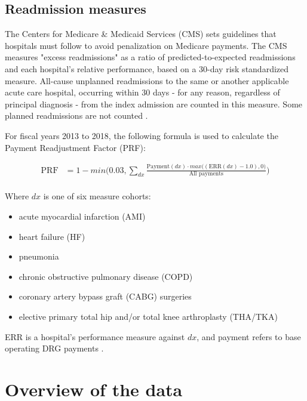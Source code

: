 \documentclass[12pt]{ociamthesis}\usepackage[]{graphicx}\usepackage[]{color}
\begin{document}
\subsection{Readmission measures}

The Centers for Medicare \& Medicaid Services (CMS) sets guidelines that hospitals must follow to avoid penalization on Medicare payments. 
The CMS measures "excess readmissions" as a ratio of predicted-to-expected readmissions and each hospital's relative performance, based on
a 30-day risk standardized measure. All-cause unplanned readmissions to the same or another applicable acute care hospital, 
occurring within 30 days - for any reason, regardless of principal diagnosis - from the index admission are counted in this measure.
Some planned readmissions are not counted \cite{HRRP}. 

For fiscal years 2013 to 2018, the following formula is used to calculate the Payment Readjustment Factor (PRF):

\begin{equation} \label{prf}
\begin{split}
  \text{PRF} &= 1 - min\bigg(0.03, \sum_{dx} \frac{\text{Payment}(dx) \cdot max\big((\text{ERR}(dx) - 1.0), 0\big)}{\text{All payments}}\bigg) \\
\end{split}
\end{equation}
 
Where $dx$ is one of six measure cohorts: 

\begin{itemize}
  \item acute myocardial infarction (AMI)
  \item heart failure (HF)
  \item pneumonia
  \item chronic obstructive pulmonary disease (COPD)
  \item coronary artery bypass graft (CABG) surgeries
  \item elective primary total hip and/or total knee arthroplasty (THA/TKA)
\end{itemize}

ERR is a hospital's performance measure against $dx$, and payment refers to base operating DRG payments \cite{HRRPPaymentAdjustment, Lessa2015}.


\section{Overview of the data}
\end{document}
